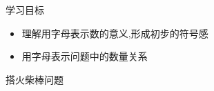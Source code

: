 \documentclass{beamer}
\begin{document}
\kaishu
{}
\begin{frame}{学习目标}
  \begin{itemize}[<+->]
    \item 理解用字母表示数的意义,形成初步的符号感
    \item 用字母表示问题中的数量关系
  \end{itemize}
\end{frame}


\begin{frame}{搭火柴棒问题}
\end{frame}


\begin{frame}{}

\end{frame}

\begin{frame}{}

\end{frame}

\begin{frame}{}

\end{frame}

\begin{frame}{}

\end{frame}

\begin{frame}{}

\end{frame}

\begin{frame}{}

\end{frame}
\end{document}
